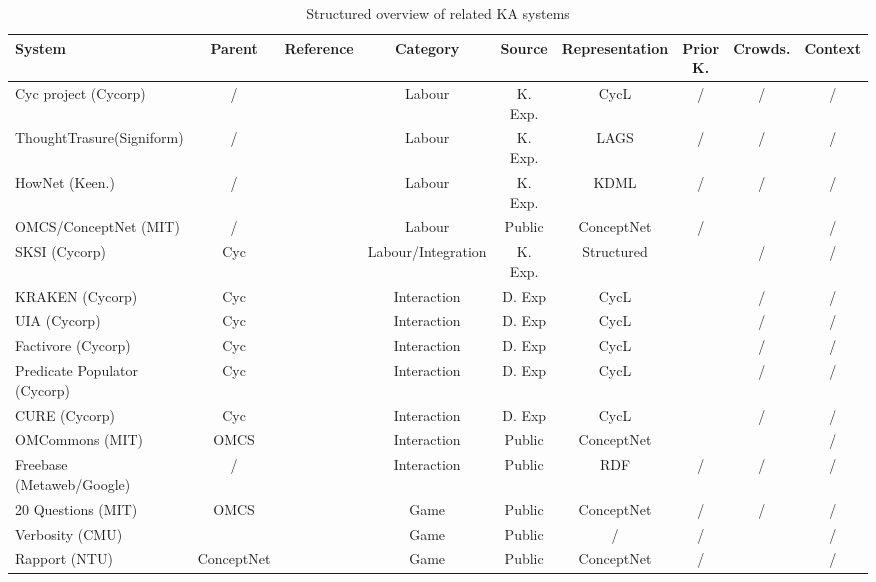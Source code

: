 \begin{landscape}
	\begin{table}[htb]
	\caption{Structured overview of related KA systems}
	\label{tab:related}
	\centering
	\begin{adjustbox}{width=1.6\textwidth}
	
	\begin{tabular}{lclcccccc}
		\hline
		System & Parent & Reference & Category & Source & Representation & Prior K. &  Crowds. & Context \\
		\hline
		Cyc project (Cycorp) & / & \parencite{Lenat1995} & Labour & K. Exp. & CycL & / & / & / \\
		ThoughtTrasure(Signiform) & / & \parencite{Mueller2003} & Labour & K. Exp. & LAGS & / & / & / \\
		HowNet (Keen.) & / & \parencite{Dong2010} & Labour & K. Exp. & KDML & / & / & / \\
		OMCS/ConceptNet (MIT) & / & \parencite{Singh2002a} & Labour & Public & ConceptNet & / & \checkmark & / \\
	    SKSI (Cycorp) & Cyc & \parencite{Masters2007} & Labour/Integration & K. Exp. &  Structured & \checkmark & / & / \\
		KRAKEN (Cycorp) & Cyc & \parencite{Panton2002a} & Interaction & D. Exp & CycL & \checkmark & / & / \\
		UIA (Cycorp) & Cyc & \parencite{Witbrock2003UIA} & Interaction & D. Exp & CycL & \checkmark & / & / \\
		Factivore (Cycorp) & Cyc & \parencite{Witbrock2005} & Interaction & D. Exp & CycL & \checkmark & / & / \\
		Predicate Populator (Cycorp) & Cyc & \parencite{Witbrock2005} & Interaction & D. Exp & CycL & \checkmark & / & / \\
		CURE (Cycorp) & Cyc & \parencite{Witbrock2010} & Interaction & D. Exp & CycL & \checkmark & / & / \\
		OMCommons (MIT) & OMCS & \parencite{Speer2007} & Interaction & Public & ConceptNet & \checkmark & \checkmark & / \\
		Freebase (Metaweb/Google) & / & \parencite{Bollacker2008} & Interaction & Public & RDF & / & / & / \\
		20 Questions (MIT) & OMCS & \parencite{Speer2009} & Game & Public & ConceptNet & / & / & / \\
		Verbosity (CMU) &   & \parencite{VonAhn2006a}  & Game & Public & /  & /  & \checkmark  & /  \\
		Rapport (NTU) & ConceptNet &  \parencite{Kuo2009}  & Game & Public  & ConceptNet  & /  & \checkmark  & /  \\

\end{tabular}
\end{adjustbox}
\end{table}
\end{landscape}
